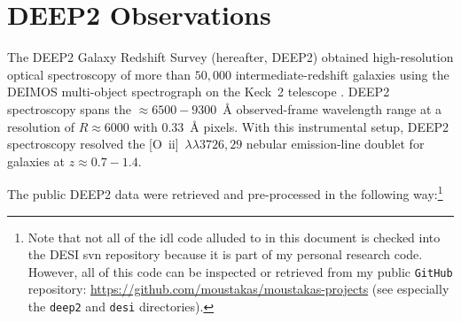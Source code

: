 \documentclass[12pt]{article}
\newcommand{\oiilam}{[O~{\sc ii}]~\ensuremath{\lambda\lambda3726,29}}
\begin{document}
\section{DEEP2 Observations}

The DEEP2 Galaxy Redshift Survey (hereafter, DEEP2) obtained
high-resolution optical spectroscopy of more than $50,000$
intermediate-redshift galaxies using the DEIMOS multi-object
spectrograph on the Keck~2 telescope \citep{newman13a}.  DEEP2
spectroscopy spans the $\approx6500-9300$~\AA{} observed-frame
wavelength range at a resolution of $R\approx6000$ with $0.33$~\AA{}
pixels.  With this instrumental setup, DEEP2 spectroscopy resolved the
\oiilam{} nebular emission-line doublet for galaxies at
$z\approx0.7-1.4$.

The public DEEP2 data were retrieved and pre-processed in the
following way:\footnote{Note that not all of the {\sc idl} code
  alluded to in this document is checked into the DESI {\sc svn}
  repository because it is part of my personal research code.
  However, all of this code can be inspected or retrieved from my
  public {\tt GitHub} repository:
  \url{https://github.com/moustakas/moustakas-projects} (see
  especially the {\tt deep2} and {\tt desi} directories).}

\end{document}
